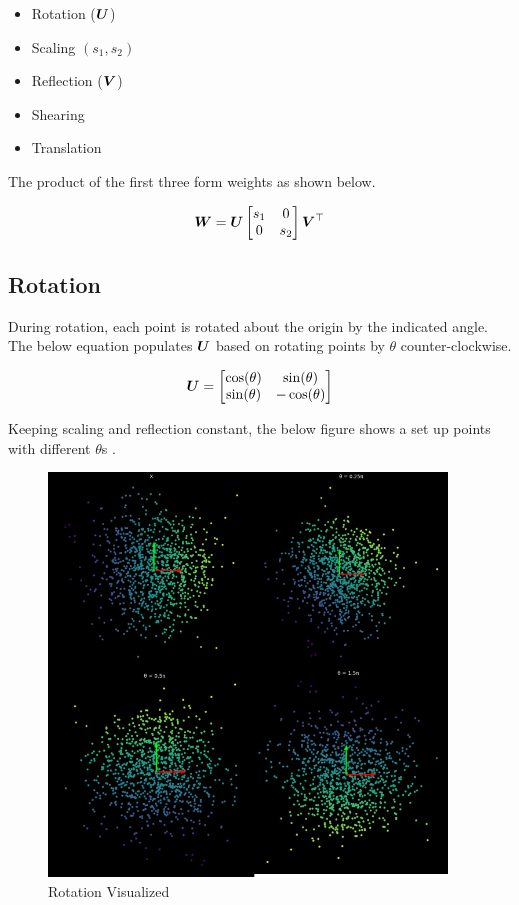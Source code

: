 \begin{itemize}
\item
Rotation (\(\matr{U}\))

\item
Scaling \((s_1, s_2)\)

\item
Reflection (\(\matr{V}\))
\item
Shearing
\item
Translation
\end{itemize}

The product of the first three form weights as shown below.

\[
\matr{W} = \matr{U}
\begin{bmatrix}
    s_1 & 0 \\
    0 & s_2 
\end{bmatrix}
\matr{V}^\top
\]


\subsection{Rotation}
During rotation, each point is rotated about the origin by the indicated angle. 
The below equation populates $\matr{U}$ based on rotating points by \(\theta\) counter-clockwise.

\[
\matr{U} = 
\begin{bmatrix}
    \cos(\theta) & \sin(\theta)\\
    \sin(\theta) & -\cos(\theta)
\end{bmatrix}
\]

Keeping scaling and reflection constant, the below figure shows a set up points with different  \(\theta\)s .

\begin{figure}[H]
\begin{center}
\includegraphics[width=300pt]{figs/Rotation.png}
\end{center} 
\caption{Rotation Visualized}
\end{figure}


